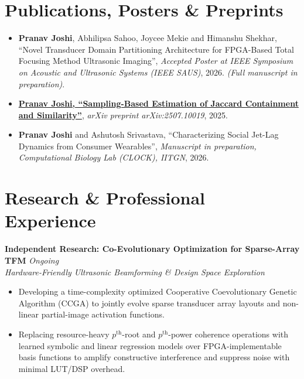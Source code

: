 \documentclass[10pt,a4paper]{article}
\newcommand{\entryheader}[4]{
  \textbf{#1} \hfill \textit{#2} \\
  \textit{#3} \hfill #4 \vspace{2pt}
}
\begin{document}
\section{Publications, Posters \& Preprints}
\begin{itemize}
    \item \textbf{Pranav Joshi}, Abhilipsa Sahoo, Joycee Mekie and Himanshu Shekhar, ``Novel Transducer Domain Partitioning Architecture for FPGA-Based Total Focusing Method Ultrasonic Imaging'', \textit{Accepted Poster at IEEE Symposium on Acoustic and Ultrasonic Systems (IEEE SAUS)}, 2026. \textit{(Full manuscript in preparation)}.
    \item \textbf{\href{https://arxiv.org/abs/2507.10019}{Pranav Joshi, ``Sampling-Based Estimation of Jaccard Containment and Similarity''}}, \textit{arXiv preprint arXiv:2507.10019}, 2025.
    \item \textbf{Pranav Joshi} and Ashutosh Srivastava, ``Characterizing Social Jet-Lag Dynamics from Consumer Wearables'', \textit{Manuscript in preparation, Computational Biology Lab (CLOCK), IITGN}, 2026.
\end{itemize}

\section{Research \& Professional Experience}

\entryheader{Independent Research: Co-Evolutionary Optimization for Sparse-Array TFM}{Ongoing}{Hardware-Friendly Ultrasonic Beamforming \& Design Space Exploration}{}
\begin{itemize}
    \item Developing a time-complexity optimized Cooperative Coevolutionary Genetic Algorithm (CCGA) to jointly evolve sparse transducer array layouts and non-linear partial-image activation functions.
    \item Replacing resource-heavy $p^{\text{th}}$-root and $p^{\text{th}}$-power coherence operations with learned symbolic and linear regression models over FPGA-implementable basis functions to amplify constructive interference and suppress noise with minimal LUT/DSP overhead.
\end{itemize}
\end{document}
